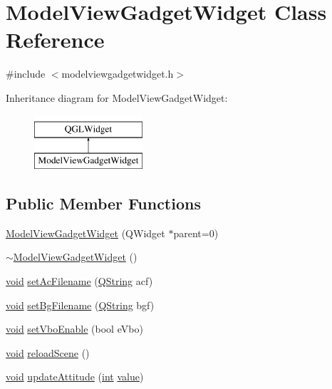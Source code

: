 \hypertarget{class_model_view_gadget_widget}{\section{Model\-View\-Gadget\-Widget Class Reference}
\label{class_model_view_gadget_widget}
}


{\ttfamily \#include $<$modelviewgadgetwidget.\-h$>$}

Inheritance diagram for Model\-View\-Gadget\-Widget\-:\begin{figure}[H]
\begin{center}
\leavevmode
\includegraphics[height=2.000000cm]{class_model_view_gadget_widget}
\end{center}
\end{figure}
\subsection*{Public Member Functions}
\begin{DoxyCompactItemize}
\item 
\hyperlink{group___model_view_plugin_ga7b299b7e0c58f0bca02228b6376370a6}{Model\-View\-Gadget\-Widget} (Q\-Widget $\ast$parent=0)
\item 
\hyperlink{group___model_view_plugin_gafd8359344ca9b61a21a93e1256e9247a}{$\sim$\-Model\-View\-Gadget\-Widget} ()
\item 
\hyperlink{group___u_a_v_objects_plugin_ga444cf2ff3f0ecbe028adce838d373f5c}{void} \hyperlink{group___model_view_plugin_ga61a44ab1922172cfaee66b78fde29538}{set\-Ac\-Filename} (\hyperlink{group___u_a_v_objects_plugin_gab9d252f49c333c94a72f97ce3105a32d}{Q\-String} acf)
\item 
\hyperlink{group___u_a_v_objects_plugin_ga444cf2ff3f0ecbe028adce838d373f5c}{void} \hyperlink{group___model_view_plugin_gab29343cadc70576f4b7d8f91dd1a3863}{set\-Bg\-Filename} (\hyperlink{group___u_a_v_objects_plugin_gab9d252f49c333c94a72f97ce3105a32d}{Q\-String} bgf)
\item 
\hyperlink{group___u_a_v_objects_plugin_ga444cf2ff3f0ecbe028adce838d373f5c}{void} \hyperlink{group___model_view_plugin_ga9ae7a41d63686c2ec25ee02e08ffed21}{set\-Vbo\-Enable} (bool e\-Vbo)
\item 
\hyperlink{group___u_a_v_objects_plugin_ga444cf2ff3f0ecbe028adce838d373f5c}{void} \hyperlink{group___model_view_plugin_gad031b977be54f4bd5243fa4d6f846f68}{reload\-Scene} ()
\item 
\hyperlink{group___u_a_v_objects_plugin_ga444cf2ff3f0ecbe028adce838d373f5c}{void} \hyperlink{group___model_view_plugin_gaa7c16fd0b59ded87f8d136fd72680dca}{update\-Attitude} (\hyperlink{ioapi_8h_a787fa3cf048117ba7123753c1e74fcd6}{int} \hyperlink{glext_8h_aa0e2e9cea7f208d28acda0480144beb0}{value})
\end{DoxyCompactItemize}


